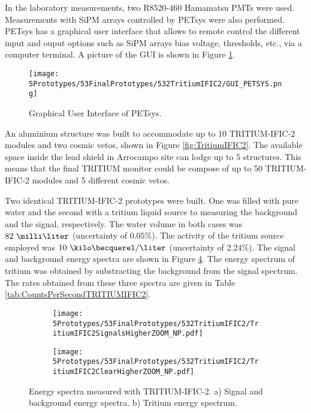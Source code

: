 In the laboratory measurements, two R8520-460 Hamamatsu PMTs \cite{DataSheetPMTs} were used. Measurements with SiPM arrays controlled by PETsys were also performed. PETsys has a graphical user interface that allows to remote control the different input and ouput options such as SiPM arrays bias voltage, thresholds, etc., via a computer terminal. A picture of the GUI is shown in Figure \ref{fig:GUI_PETSYS}.
\begin{figure}[h]
\centering
\texttt{[image: 5Prototypes/53FinalPrototypes/532TritiumIFIC2/GUI\_PETSYS.png]}
\caption{Graphical User Interface of PETsys.\label{fig:GUI_PETSYS}}
\end{figure} 

An aluminium structure was built to accommodate up to 10 TRITIUM-IFIC-2 modules and two cosmic vetos, shown in Figure \ref{fig:TritiumIFIC2}. The available space inside the lead shield in Arrocampo site can lodge up to 5 structures. This means that the final TRITIUM monitor could be compose of up to 50 TRITIUM-IFIC-2 modules and 5 different cosmic vetos.

Two identical TRITIUM-IFIC-2 prototypes were built. One was filled with pure water and the second with a tritium liquid source to measuring the background and the signal, respectively. The water volume in both cases was $82~\milli\liter$ (uncertainty of $0.05\%$). The activity of the tritium source employed was $10~\kilo\becquerel/\liter$ (uncertainty of $2.24\%$). The signal and background energy spectra are shown in Figure \ref{fig:EnergySpectraTRITIUMIFIC2}. The energy spectrum of tritium was obtained by substracting the background from the signal spectrum. The rates obtained from these three spectra are given in Table \ref{tab:CountsPerSecondTRITIUMIFIC2}. 

\begin{figure}
\centering
    \begin{subfigure}[b]{0.73\textwidth}
    \centering
    \texttt{[image: 5Prototypes/53FinalPrototypes/532TritiumIFIC2/TritiumIFIC2SignalsHigherZOOM\_NP.pdf]}  
    \caption{\label{subfig:SignalBackgroundEnergySpectraTritiumIFIC2}}
    \end{subfigure}
    \hfill
    \begin{subfigure}[b]{0.73\textwidth}
    \centering
    \texttt{[image: 5Prototypes/53FinalPrototypes/532TritiumIFIC2/TritiumIFIC2ClearHigherZOOM\_NP.pdf]}  
    \caption{\label{subfig:TritiumEnergySpectraTritiumIFIC2}}
    \end{subfigure}
 \caption{Energy spectra measured with TRITIUM-IFIC-2. a) Signal and background energy spectra. b) Tritium energy spectrum.}
 \label{fig:EnergySpectraTRITIUMIFIC2}
\end{figure}

